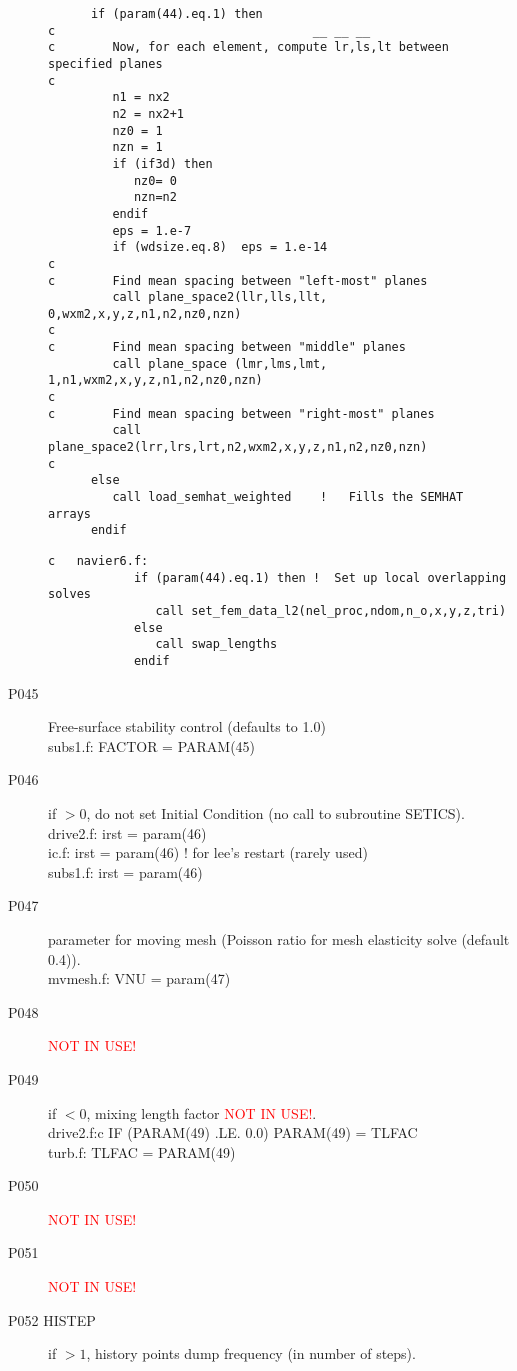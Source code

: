 \begin{description}
\begin{lstlisting}
      if (param(44).eq.1) then
c                                    __ __ __
c        Now, for each element, compute lr,ls,lt between specified planes
c
         n1 = nx2
         n2 = nx2+1
         nz0 = 1
         nzn = 1
         if (if3d) then
            nz0= 0
            nzn=n2
         endif
         eps = 1.e-7
         if (wdsize.eq.8)  eps = 1.e-14
c
c        Find mean spacing between "left-most" planes
         call plane_space2(llr,lls,llt, 0,wxm2,x,y,z,n1,n2,nz0,nzn)
c
c        Find mean spacing between "middle" planes
         call plane_space (lmr,lms,lmt, 1,n1,wxm2,x,y,z,n1,n2,nz0,nzn)
c
c        Find mean spacing between "right-most" planes
         call plane_space2(lrr,lrs,lrt,n2,wxm2,x,y,z,n1,n2,nz0,nzn)
c
      else
         call load_semhat_weighted    !   Fills the SEMHAT arrays
      endif
\end{lstlisting} 
\begin{lstlisting}
c   navier6.f:  
            if (param(44).eq.1) then !  Set up local overlapping solves 
               call set_fem_data_l2(nel_proc,ndom,n_o,x,y,z,tri)
            else
               call swap_lengths
            endif
\end{lstlisting} 
\item [P045  ] Free-surface stability control (defaults to 1.0)\\
subs1.f:      FACTOR = PARAM(45)
\item [P046  ] if $>0$, do not set Initial Condition (no call to subroutine SETICS).\\
drive2.f:      irst = param(46)\\
ic.f:      irst = param(46)        ! for lee's restart (rarely used)\\
subs1.f:      irst = param(46)
\item [P047  ] parameter for moving mesh (Poisson ratio for mesh elasticity solve (default 0.4)).\\
mvmesh.f:      VNU    = param(47)
\item [P048  ] {\textcolor{red}{ NOT IN USE!}}
\item [P049  ] if $<0$, mixing length factor {\textcolor{red}{ NOT IN USE!}}.\\
drive2.f:c     IF (PARAM(49) .LE. 0.0) PARAM(49) = TLFAC\\
turb.f:      TLFAC = PARAM(49)
\item [P050  ] {\textcolor{red}{ NOT IN USE!}}
\item [P051  ] {\textcolor{red}{ NOT IN USE!}}
\item [P052  HISTEP] if $>1$, history points dump frequency (in number of steps).\\

\end{description}
